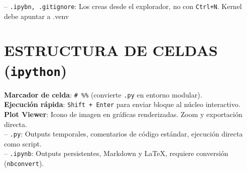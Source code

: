 -- \texttt{.ipybn, .gitignore}: Los creas desde el explorador, no con \texttt{Ctrl+N}. Kernel debe apuntar a .venv\\



\section{ESTRUCTURA DE CELDAS (\texttt{ipython})}
\textbf{Marcador de celda}: \texttt{\# \%\%} (convierte \texttt{.py} en entorno modular).\\
\textbf{Ejecución rápida}: \texttt{Shift + Enter} para enviar bloque al núcleo interactivo.\\
\textbf{Plot Viewer}: Icono de imagen en gráficas renderizadas. Zoom y exportación directa.\\
-- \texttt{.py}: Outputs temporales, comentarios de código estándar, ejecución directa como script.\\
-- \texttt{.ipynb}: Outputs persistentes, Markdown y \LaTeX, requiere conversión (\texttt{nbconvert}).

